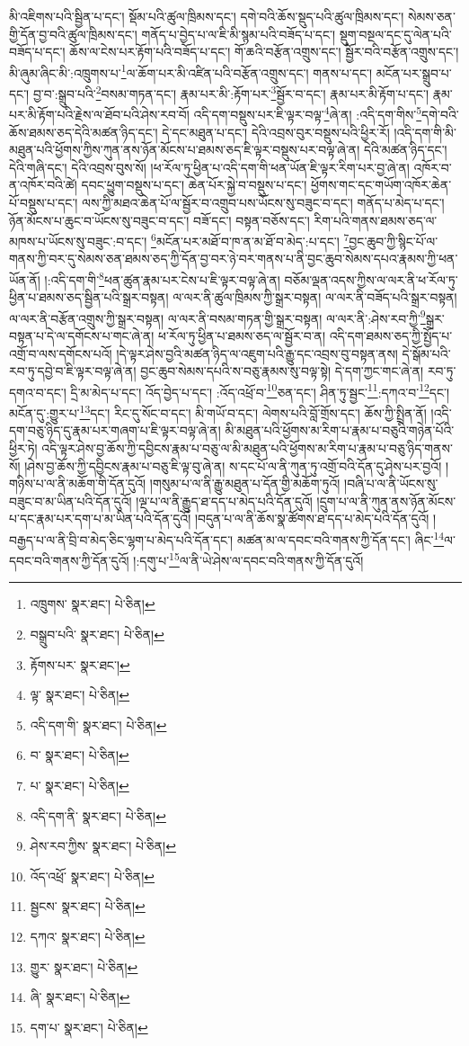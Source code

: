 མི་འཇིགས་པའི་སྦྱིན་པ་དང་། སྡོམ་པའི་ཚུལ་ཁྲིམས་དང་། དགེ་བའི་ཆོས་སྡུད་པའི་ཚུལ་ཁྲིམས་དང་། སེམས་ཅན་གྱི་དོན་བྱ་བའི་ཚུལ་ཁྲིམས་དང་། གནོད་པ་བྱེད་པ་ལ་ཇི་མི་སྙམ་པའི་བཟོད་པ་དང་། སྡུག་བསྔལ་དང་དུ་ལེན་པའི་བཟོད་པ་དང་། ཆོས་ལ་ངེས་པར་རྟོག་པའི་བཟོད་པ་དང་། གོ་ཆའི་བརྩོན་འགྲུས་དང་། སྦྱོར་བའི་བརྩོན་འགྲུས་དང་། མི་ཞུམ་ཞིང་མི་:འཁྲུགས་པ་\footnote{འཁྲུགས་  སྣར་ཐང་།  པེ་ཅིན། }ལ་ཆོག་པར་མི་འཛིན་པའི་བརྩོན་འགྲུས་དང་། གནས་པ་དང་། མངོན་པར་སྒྲུབ་པ་དང་། བྱ་བ་:སྒྲུབ་པའི་\footnote{བསྒྲུབ་པའི་  སྣར་ཐང་།  པེ་ཅིན། }བསམ་གཏན་དང་། རྣམ་པར་མི་:རྟོག་པར་\footnote{རྟོགས་པར་  སྣར་ཐང་། }སྦྱོར་བ་དང་། རྣམ་པར་མི་རྟོག་པ་དང་། རྣམ་པར་མི་རྟོག་པའི་རྗེས་ལ་ཐོབ་པའི་ཤེས་རབ་བོ། འདི་དག་བསྡུས་པར་ཇི་ལྟར་བལྟ་\footnote{ལྟ་  སྣར་ཐང་།  པེ་ཅིན། }ཞེ་ན། :འདི་དག་གིས་\footnote{འདི་དག་གི་  སྣར་ཐང་།  པེ་ཅིན། }དགེ་བའི་ཆོས་ཐམས་ཅད་དེའི་མཚན་ཉིད་དང་། དེ་དང་མཐུན་པ་དང་། དེའི་འབྲས་བུར་བསྡུས་པའི་ཕྱིར་རོ། །འདི་དག་གི་མི་མཐུན་པའི་ཕྱོགས་ཀྱིས་ཀུན་ནས་ཉོན་མོངས་པ་ཐམས་ཅད་ཇི་ལྟར་བསྡུས་པར་བལྟ་ཞེ་ན། དེའི་མཚན་ཉིད་དང་། དེའི་གཞི་དང་། དེའི་འབྲས་བུས་སོ། །ཕ་རོལ་ཏུ་ཕྱིན་པ་འདི་དག་གི་ཕན་ཡོན་ཇི་ལྟར་རིག་པར་བྱ་ཞེ་ན། འཁོར་བ་ན་འཁོར་བའི་ཚེ། དབང་ཕྱུག་བསྡུས་པ་དང་། ཆེན་པོར་སྐྱེ་བ་བསྡུས་པ་དང་། ཕྱོགས་གང་དང་གཡོག་འཁོར་ཆེན་པོ་བསྡུས་པ་དང་། ལས་ཀྱི་མཐའ་ཆེན་པོ་ལ་སྦྱོར་བ་འགྲུབ་པས་ཡོངས་སུ་བཟུང་བ་དང་། གནོད་པ་མེད་པ་དང་། ཉོན་མོངས་པ་ཆུང་བ་ཡོངས་སུ་བཟུང་བ་དང་། བཟོ་དང་། བསྟན་བཅོས་དང་། རིག་པའི་གནས་ཐམས་ཅད་ལ་མཁས་པ་ཡོངས་སུ་བཟུང་:བ་དང་། \footnote{བ་  སྣར་ཐང་།  པེ་ཅིན། }མངོན་པར་མཐོ་བ་ཁ་ན་མ་ཐོ་བ་མེད་:པ་དང་། \footnote{པ་  སྣར་ཐང་།  པེ་ཅིན། }བྱང་ཆུབ་ཀྱི་སྙིང་པོ་ལ་གནས་ཀྱི་བར་དུ་སེམས་ཅན་ཐམས་ཅད་ཀྱི་དོན་བྱ་བར་ཉེ་བར་གནས་པ་ནི་བྱང་ཆུབ་སེམས་དཔའ་རྣམས་ཀྱི་ཕན་ཡོན་ནོ། །:འདི་དག་གི་\footnote{འདི་དག་ནི་  སྣར་ཐང་།  པེ་ཅིན། }ཕན་ཚུན་རྣམ་པར་ངེས་པ་ཇི་ལྟར་བལྟ་ཞེ་ན། བཅོམ་ལྡན་འདས་ཀྱིས་ལ་ལར་ནི་ཕ་རོལ་ཏུ་ཕྱིན་པ་ཐམས་ཅད་སྦྱིན་པའི་སྒྲར་བསྟན། ལ་ལར་ནི་ཚུལ་ཁྲིམས་ཀྱི་སྒྲར་བསྟན། ལ་ལར་ནི་བཟོད་པའི་སྒྲར་བསྟན། ལ་ལར་ནི་བརྩོན་འགྲུས་ཀྱི་སྒྲར་བསྟན། ལ་ལར་ནི་བསམ་གཏན་གྱི་སྒྲར་བསྟན། ལ་ལར་ནི་:ཤེས་རབ་ཀྱི་\footnote{ཤེས་རབ་ཀྱིས་  སྣར་ཐང་།  པེ་ཅིན། }སྒྲར་བསྟན་པ་དེ་ལ་དགོངས་པ་གང་ཞེ་ན། ཕ་རོལ་ཏུ་ཕྱིན་པ་ཐམས་ཅད་ལ་སྦྱོར་བ་ན། འདི་དག་ཐམས་ཅད་ཀྱི་སྤྱོད་པ་འགྲོ་བ་ལས་དགོངས་པའོ། །དེ་ལྟར་ཤེས་བྱའི་མཚན་ཉིད་ལ་འཇུག་པའི་རྒྱུ་དང་འབྲས་བུ་བསྟན་ནས། དེ་སྒོམ་པའི་རབ་ཏུ་དབྱེ་བ་ཇི་ལྟར་བལྟ་ཞེ་ན། བྱང་ཆུབ་སེམས་དཔའི་ས་བཅུ་རྣམས་སུ་བལྟ་སྟེ། དེ་དག་ཀྱང་གང་ཞེ་ན། རབ་ཏུ་དགའ་བ་དང་། དྲི་མ་མེད་པ་དང་། འོད་བྱེད་པ་དང་། :འོད་འཕྲོ་བ་\footnote{འོད་འཕྲོ་  སྣར་ཐང་།  པེ་ཅིན། }ཅན་དང་། ཤིན་ཏུ་སྦྱང་\footnote{སྦྱངས་  སྣར་ཐང་།  པེ་ཅིན། }:དཀའ་བ་\footnote{དཀའ་  སྣར་ཐང་།  པེ་ཅིན། }དང་། མངོན་དུ་:གྱུར་པ་\footnote{གྱུར་  སྣར་ཐང་།  པེ་ཅིན། }དང་། རིང་དུ་སོང་བ་དང་། མི་གཡོ་བ་དང་། ལེགས་པའི་བློ་གྲོས་དང་། ཆོས་ཀྱི་སྤྲིན་ནོ། །འདི་དག་བཅུ་ཉིད་དུ་རྣམ་པར་གཞག་པ་ཇི་ལྟར་བལྟ་ཞེ་ན། མི་མཐུན་པའི་ཕྱོགས་མ་རིག་པ་རྣམ་པ་བཅུའི་གཉེན་པོའི་ཕྱིར་ཏེ། འདི་ལྟར་ཤེས་བྱ་ཆོས་ཀྱི་དབྱིངས་རྣམ་པ་བཅུ་ལ་མི་མཐུན་པའི་ཕྱོགས་མ་རིག་པ་རྣམ་པ་བཅུ་ཉིད་གནས་སོ། །ཤེས་བྱ་ཆོས་ཀྱི་དབྱིངས་རྣམ་པ་བཅུ་ཇི་ལྟ་བུ་ཞེ་ན། ས་དང་པོ་ལ་ནི་ཀུན་ཏུ་འགྲོ་བའི་དོན་དུ་ཤེས་པར་བྱའོ། །གཉིས་པ་ལ་ནི་མཆོག་གི་དོན་དུའོ། །གསུམ་པ་ལ་ནི་རྒྱུ་མཐུན་པ་དོན་གྱི་མཆོག་ཏུའོ། །བཞི་པ་ལ་ནི་ཡོངས་སུ་བཟུང་བ་མ་ཡིན་པའི་དོན་དུའོ། །ལྔ་པ་ལ་ནི་རྒྱུད་ཐ་དད་པ་མེད་པའི་དོན་དུའོ། །དྲུག་པ་ལ་ནི་ཀུན་ནས་ཉོན་མོངས་པ་དང་རྣམ་པར་དག་པ་མ་ཡིན་པའི་དོན་དུའོ། །བདུན་པ་ལ་ནི་ཆོས་སྣ་ཚོགས་ཐ་དད་པ་མེད་པའི་དོན་དུའོ། །བརྒྱད་པ་ལ་ནི་བྲི་བ་མེད་ཅིང་ལྷག་པ་མེད་པའི་དོན་དང་། མཚན་མ་ལ་དབང་བའི་གནས་ཀྱི་དོན་དང་། ཞིང་\footnote{ཞི་  སྣར་ཐང་།  པེ་ཅིན། }ལ་དབང་བའི་གནས་ཀྱི་དོན་དུའོ། །:དགུ་པ་\footnote{དག་པ་  སྣར་ཐང་།  པེ་ཅིན། }ལ་ནི་ཡེ་ཤེས་ལ་དབང་བའི་གནས་ཀྱི་དོན་དུའོ། 